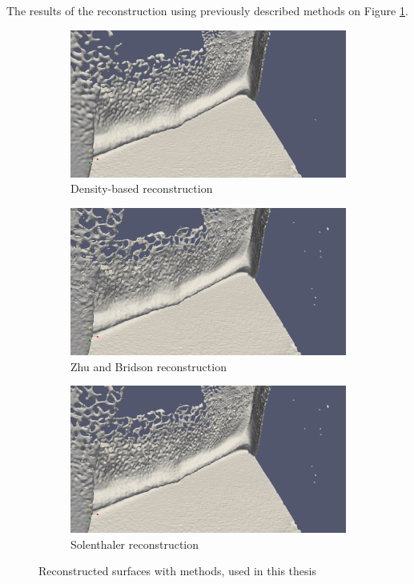 The results of the reconstruction using previously described methods on Figure \ref{fig:rec_methods}.
\begin{figure}[H]
	\begin{subfigure}[b]{\textwidth}
		\includegraphics[width=\textwidth]{figures/DencityBasedReconstruction.png}
		\caption{Density-based reconstruction \cite{DencRec}}
	\end{subfigure}
	\begin{subfigure}[b]{\textwidth}
		\includegraphics[width=\textwidth]{figures/ZhuBridsonReconstruction.png}
		\caption{Zhu and Bridson reconstruction \cite{ZhuBridson}}

	\end{subfigure}
	\begin{subfigure}[b]{\textwidth}
		\includegraphics[width=\textwidth]{figures/SolenthilerReconstruction.png}
		\caption{Solenthaler reconstruction \cite{Solenthaler}}

	\end{subfigure}
	\caption{Reconstructed surfaces with methods, used in this thesis }
	\label{fig:rec_methods}
\end{figure}
